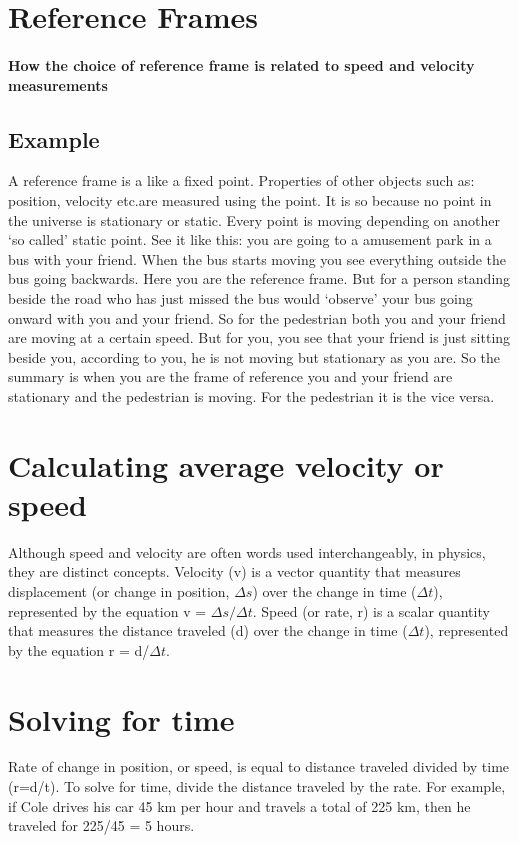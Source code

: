 \documentclass{article}
\theoremstyle{mytheoremstyle}
\theoremstyle{mytheoremstyle}
\theoremstyle{myproblemstyle}
\begin{document}
\section{Reference Frames}
\paragraph{How the choice of reference frame is related to speed and velocity measurements}
\subsection{Example}
A reference frame is a like a fixed point. Properties of other objects such as: position, velocity etc.are measured using the point.
It is so because no point in the universe is stationary or static. Every point is moving depending on another `so called' static point.
See it like this: you are going to a amusement park in a bus with your friend. When the bus starts moving you see everything outside the bus going backwards. Here you are the reference frame. But for a person standing beside the road who has just missed the bus would `observe' your bus going onward with you and your friend. So for the pedestrian both you and your friend are moving at a certain speed. But for you, you see that your friend is just sitting beside you, according to you, he is not moving but stationary as you are.
So the summary is when you are the frame of reference you and your friend are stationary and the pedestrian is moving. For the pedestrian it is the vice versa.

\section{Calculating average velocity or speed}
Although speed and velocity are often words used interchangeably, in physics, they are distinct concepts. Velocity (v) is a vector quantity that measures displacement (or change in position, $\Delta {s} $) over the change in time ($\Delta {t} $), represented by the equation v = $\Delta {s}/ \Delta {t}  $. Speed (or rate, r) is a scalar quantity that measures the distance traveled (d) over the change in time ($\Delta {t}$), represented by the equation r = d/$\Delta {t}$.
\section{Solving for time}
Rate of change in position, or speed, is equal to distance traveled divided by time (r=d/t). To solve for time, divide the distance traveled by the rate. For example, if Cole drives his car 45 km per hour and travels a total of 225 km, then he traveled for 225/45 = 5 hours.
\end{document}
